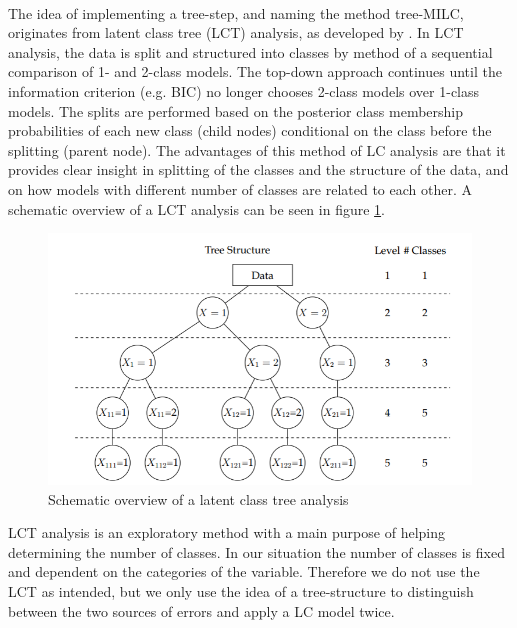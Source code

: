 \documentclass[a4paper, 11pt]{article} %
\begin{document}
\\The idea of implementing a tree-step, and naming the method tree-MILC, originates from latent class tree (LCT) analysis, as developed by . In LCT analysis, the data is split and structured into classes by method of a sequential comparison of 1- and 2-class models. The top-down approach continues until the information criterion (e.g. BIC) no longer chooses 2-class models over 1-class models. The splits are performed based on the posterior class membership probabilities of each new class (child nodes) conditional on the class before the splitting (parent node). The advantages of this method of LC analysis are that it provides clear insight in splitting of the classes and the structure of the data, and on how models with different number of classes are related to each other. A schematic overview of a LCT analysis can be seen in figure \ref{fig:LCTmattis}.

\begin{figure}[h]
    \centering
    \includegraphics[scale=.6]{LCTmattis.png}
    \caption{Schematic overview of a latent class tree analysis \cite{bergh2018latent}}
    \label{fig:LCTmattis}
\end{figure}

LCT analysis is an exploratory method with a main purpose of helping determining the number of classes. In our situation the number of classes is fixed and dependent on the categories of the variable. Therefore we do not use the LCT as intended, but we only use the idea of a tree-structure to distinguish between the two sources of errors and apply a LC model twice. 
\end{document}
